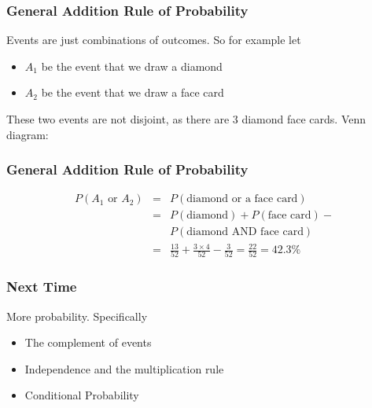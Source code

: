 \documentclass[slides]{beamer}
\begin{document}
\begin{frame}[fragile]
\frametitle{General Addition Rule of Probability}
Events are just combinations of outcomes.  \pause So for example let
\begin{itemize}
\item $A_1$ be the event that we draw a diamond
\item $A_2$ be the event that we draw a face card
\end{itemize}

\pause These two events are not disjoint, as there are 3 diamond face cards.
Venn diagram:
\vspace{3cm}

\end{frame}


\begin{frame}[fragile]
\frametitle{General Addition Rule of Probability}

\begin{eqnarray*}
P(A_1 \mbox{ or } A_2) &=& P(\mbox{diamond or a face card})\\
&=& P(\mbox{diamond}) + P(\mbox{face card}) - \\
&&P(\mbox{diamond AND face card})\\
&=& \frac{13}{52} + \frac{3 \times 4}{52} - \frac{3}{52} = \frac{22}{52} = 42.3\%
\end{eqnarray*}


\end{frame}



\begin{frame}[fragile]
\frametitle{Next Time}

More probability.  Specifically
\begin{itemize}
\item The complement of events
\item Independence and the multiplication rule
\item Conditional Probability
\end{itemize}


\end{frame}
\end{document}
